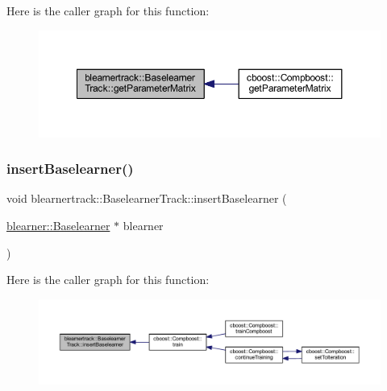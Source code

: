 Here is the caller graph for this function\+:\nopagebreak
\begin{figure}[H]
\begin{center}
\leavevmode
\includegraphics[width=350pt]{classblearnertrack_1_1_baselearner_track_a4b6d2d8b585148c71ed5b6055c9ab08c_icgraph}
\end{center}
\end{figure}
\mbox{\label{classblearnertrack_1_1_baselearner_track_abc5f42093449e665b5b0dfeee8570953}} 
\subsubsection{\texorpdfstring{insert\+Baselearner()}{insertBaselearner()}}
{\footnotesize\ttfamily void blearnertrack\+::\+Baselearner\+Track\+::insert\+Baselearner (\begin{DoxyParamCaption}\item[{\mbox{\hyperlink{classblearner_1_1_baselearner}{blearner\+::\+Baselearner}} $\ast$}]{blearner }\end{DoxyParamCaption})}

Here is the caller graph for this function\+:
\nopagebreak
\begin{figure}[H]
\begin{center}
\leavevmode
\includegraphics[width=350pt]{classblearnertrack_1_1_baselearner_track_abc5f42093449e665b5b0dfeee8570953_icgraph}
\end{center}
\end{figure}
\mbox{\label{classblearnertrack_1_1_baselearner_track_a06f0ac986a158eecddce64e6c7af0750}} 
